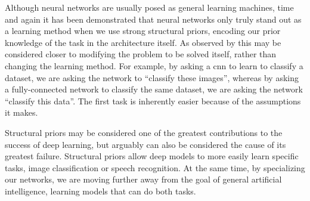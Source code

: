 \documentclass[thesis]{subfiles}
\begin{document}
	Although neural networks are usually posed as general learning machines, time and again it has been demonstrated that neural networks only truly stand out as a learning method when we use strong structural priors, encoding our prior knowledge of the task in the architecture itself. As observed by \citet{denker1987large} this may be considered closer to modifying the problem to be solved itself, rather than changing the learning method. For example, by asking a \gls{cnn} to learn to classify a dataset, we are asking the network to ``classify these images'', whereas by asking a fully-connected network to classify the same dataset, we are asking the network ``classify this data''. The first task is inherently easier because of the assumptions it makes.

    Structural priors may be considered one of the greatest contributions to the success of deep learning, but arguably can also be considered the cause of its greatest failure. Structural priors allow deep models to more easily learn specific tasks, \ie image classification or speech recognition. At the same time, by specializing our networks, we are moving further away from the goal of general artificial intelligence, \ie learning models that can do both tasks.
    



\end{document}
